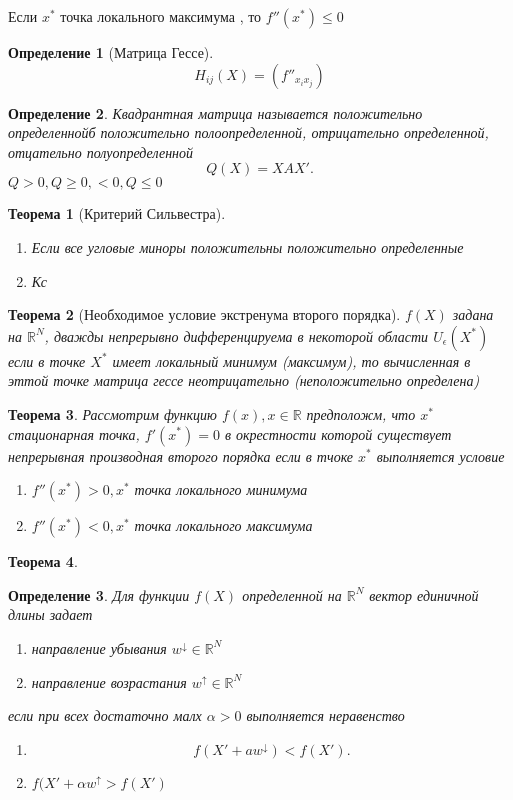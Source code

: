 \documentclass[14pt]{extarticle}
\newtheorem{theorem}{Теорема}
\newtheorem{definition}{Определение}
\begin{document}
Если $x^{*}$ точка локального максимума , то $f''(x^{*}) \le  0$
\begin{definition}[Матрица Гессе]
	\begin{equation}
		H_{ij}(X) = (f''_{x_{i} x_{j}})
	\end{equation}
\end{definition}
\begin{definition}
	Квадрантная матрица называется положительно определеннойб
	положительно полоопределенной,
	отрицательно определенной,
	отцательно полуопределенной
	\[
	Q(X) = X A X'
	.\] 
	$Q>0,Q\ge 0,<0,Q\le 0$
\end{definition}
\begin{theorem}[Критерий Сильвестра]
	\begin{enumerate}
		\item Если все угловые миноры положительны положительно определенные
		\item Кс
	\end{enumerate}
\end{theorem}
\begin{theorem}[Необходимое условие экстренума второго порядка]
	$f(X)$ задана на  $\mathbb{R}^{N}$, дважды непрерывно дифференцируема
	в некоторой области $U_{\epsilon}(X^{*})$ 
	если в точке $X^{*}$ имеет локальный минимум (максимум),
	то вычисленная в эттой точке матрица гессе неотрицательно (неположительно определена)
\end{theorem}
\begin{theorem}
	Рассмотрим функцию $f(x), x\in \mathbb{R}$ предположм, что
	$x^{*}$ стационарная точка, $f'(x^{*}) = 0$ в окрестности
	которой существует непрерывная производная
	второго порядка
	если в тчоке $x^{*}$ выполняется условие
	\begin{enumerate}
		\item $f''(x^{*}) > 0,x^{*}$ точка локального минимума
		\item $f''(x^{*}) < 0, x^{*}$ точка локального максимума
	\end{enumerate}
\end{theorem}
\begin{theorem}

\end{theorem}
\begin{definition}
	Для функции $f(X)$ определенной на  $\mathbb{R}^{N}$ 
	вектор единичной длины задает
	\begin{enumerate}
		\item направление убывания $w^{\downarrow} \in \mathbb{R}^{N}$
		\item направление возрастания $w^{\uparrow} \in \mathbb{R}^{N}$
	\end{enumerate}
	если при всех достаточно малх $\alpha > 0$ выполняется неравенство
	\begin{enumerate}
		\item 

	 \[
	f(X' + a w^{\downarrow}) < f(X')
	.\] 
\item  $f(X' + \alpha w^{\uparrow} > f(X')$
	\end{enumerate}
\end{definition}
\end{document}
